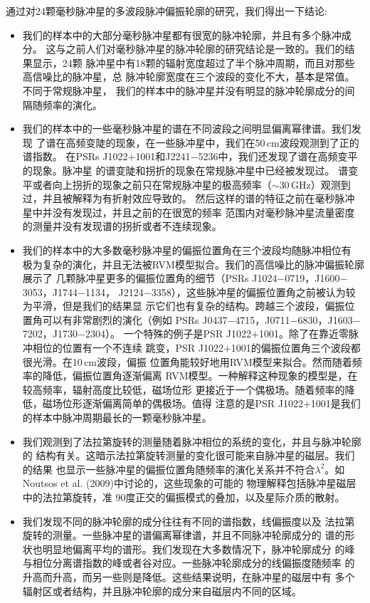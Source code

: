 通过对24颗毫秒脉冲星的多波段脉冲偏振轮廓的研究，我们得出一下结论:
\begin{itemize}
\item 我们的样本中的大部分毫秒脉冲星都有很宽的脉冲轮廓，并且有多个脉冲成分。
这与之前人们对毫秒脉冲星的脉冲轮廓的研究结论是一致的。我们的结果显示，24颗
脉冲星中有18颗的辐射宽度超过了半个脉冲周期，而且对那些高信噪比的脉冲星，总
脉冲轮廓宽度在三个波段的变化不大，基本是常值。不同于常规脉冲星\supercite{Cordes78,Thorsett91,Mitra02,Mitra04,Chen14}，
我们的样本中的脉冲星并没有明显的脉冲轮廓成分的间隔随频率的演化\supercite{Kramer99}。
\item 我们的样本中的一些毫秒脉冲星的谱在不同波段之间明显偏离幂律谱。我们发现
了谱在高频变陡的现象，在一些脉冲星中，我们在50\,cm波段观测到了正的谱指数。
在PSRs J1022$+$1001和J2241$-$5236中，我们还发现了谱在高频变平的现象。脉冲星
的谱变陡和拐折的现象在常规脉冲星中已经被发现过\supercite{Maron00,Kijak11}。
谱变平或者向上拐折的现象之前只在常规脉冲星的极高频率（$\sim$30\,GHz）观测到
过\supercite{Kramer96}，并且被解释为有折射效应导致的\supercite{Petrova02}。
然后这样的谱的特征之前在毫秒脉冲星中并没有发现过，并且之前的在很宽的频率
范围内对毫秒脉冲星流量密度的测量并没有发现谱的拐折或者不连续现象\supercite{Kramer99,Kuzmin01}。
\item 我们的样本中的大多数毫秒脉冲星的偏振位置角在三个波段均随脉冲相位有
极为复杂的演化，并且无法被RVM模型拟合。我们的高信噪比的脉冲偏振轮廓展示了
几颗脉冲星更多的偏振位置角的细节（PSRs J1024$-$0719，J1600$-$3053，J1744$-$1134，
J2124$-$3358），这些脉冲星的偏振位置角之前被认为较为平滑，但是我们的结果显
示它们也有复杂的结构。跨越三个波段，偏振位置角可以有非常剧烈的演化（例如
PSRs J0437$-$4715，J0711$-$6830，J1603$-$7202，J1730$-$2304）。
一个特殊的例子是PSR J1022$+$1001。除了在靠近零脉冲相位的位置有一个不连续
跳变，PSR J1022$+$1001的偏振位置角三个波段都很光滑。在10\,cm波段，偏振
位置角能较好地用RVM模型来拟合。然而随着频率的降低，偏振位置角逐渐偏离
RVM模型。一种解释这种现象的模型是，在较高频率，辐射高度比较低，磁场位形
更接近于一个偶极场。随着频率的降低，磁场位形逐渐偏离简单的偶极场。值得
注意的是PSR J1022$+$1001是我们的样本中脉冲周期最长的一颗毫秒脉冲星。
\item 我们观测到了法拉第旋转的测量随着脉冲相位的系统的变化，并且与脉冲轮廓的
结构有关。这暗示法拉第旋转测量的变化很可能来自脉冲星的磁层。我们的结果
也显示一些脉冲星的偏振位置角随频率的演化关系并不符合$\lambda^2$。如
Noutsos et al. (2009)\supercite{Noutsos09}中讨论的，这些现象的可能的
物理解释包括脉冲星磁层中的法拉第旋转\supercite{Kennett98,Wang11}，准
90度正交的偏振模式的叠加\supercite{Ramach04}，以及星际介质的散射\supercite{Kara09}。
\item 我们发现不同的脉冲轮廓的成分往往有不同的谱指数，线偏振度以及
法拉第旋转的测量。一些脉冲星的谱偏离幂律谱，并且不同脉冲轮廓成分的
谱的形状也明显地偏离平均的谱形。我们发现在大多数情况下，脉冲轮廓成分
的峰与相位分离谱指数的峰或者谷对应。一些脉冲轮廓成分的线偏振度随频率
的升高而升高，而另一些则是降低。这些结果说明，在脉冲星的磁层中有
多个辐射区或者结构，并且脉冲轮廓的成分来自磁层内不同的区域\supercite{Dyks10}。
\end{itemize}

